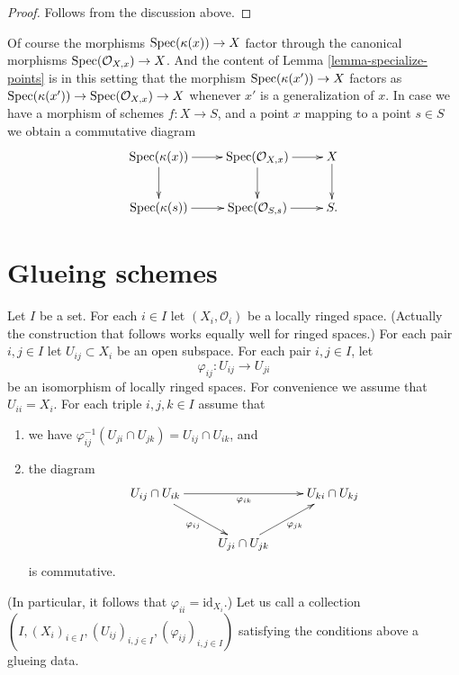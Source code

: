 \begin{proof}
Follows from the discussion above.
\end{proof}

\noindent
Of course the morphisms $\mathop{\mathrm{Spec}}(\kappa(x)) \to X$
factor through the canonical morphisms
$\mathop{\mathrm{Spec}}(\mathcal{O}_{X, x}) \to X$.
And the content of Lemma \ref{lemma-specialize-points} is in
this setting that the morphism $\mathop{\mathrm{Spec}}(\kappa(x')) \to X$
factors as
$\mathop{\mathrm{Spec}}(\kappa(x')) \to \mathop{\mathrm{Spec}}(\mathcal{O}_{X, x}) \to X$
whenever $x'$ is a generalization of $x$.
In case we have a morphism of schemes $f : X \to S$,
and a point $x$ mapping to a point $s \in S$ we obtain
a commutative diagram
$$
\xymatrix{
\Spec(\kappa(x)) \ar[r] \ar[d] &
\Spec(\mathcal{O}_{X, x}) \ar[r] \ar[d] &
X \ar[d] \\
\Spec(\kappa(s)) \ar[r] &
\Spec(\mathcal{O}_{S, s}) \ar[r] &
S.
}
$$










\section{Glueing schemes}
\label{section-glueing-schemes}

\noindent
Let $I$ be a set.
For each $i \in I$ let $(X_i, \mathcal{O}_i)$ be
a locally ringed space. (Actually the construction that
follows works equally well for ringed spaces.)
For each pair $i, j \in I$ let $U_{ij} \subset X_i$
be an open subspace.
For each pair $i, j \in I$, let
$$
\varphi_{ij} : U_{ij} \to U_{ji}
$$
be an isomorphism of locally ringed spaces.
For convenience we assume that $U_{ii} = X_i$.
For each triple $i, j, k \in I$ assume that
\begin{enumerate}
\item we have
$\varphi_{ij}^{-1}(U_{ji} \cap U_{jk}) =  U_{ij} \cap U_{ik}$, and
\item the diagram
$$
\xymatrix{
U_{ij} \cap U_{ik} \ar[rr]_{\varphi_{ik}} \ar[rd]_{\varphi_{ij}} & &
U_{ki} \cap U_{kj} \\
& U_{ji} \cap U_{jk} \ar[ru]_{\varphi_{jk}}
}
$$
is commutative.
\end{enumerate}
(In particular, it follows that $\varphi_{ii} = \text{id}_{X_i}$.)
Let us call a collection
$(I, (X_i)_{i\in I}, (U_{ij})_{i, j\in I}, (\varphi_{ij})_{i, j\in I})$
satisfying the conditions above a glueing data.

